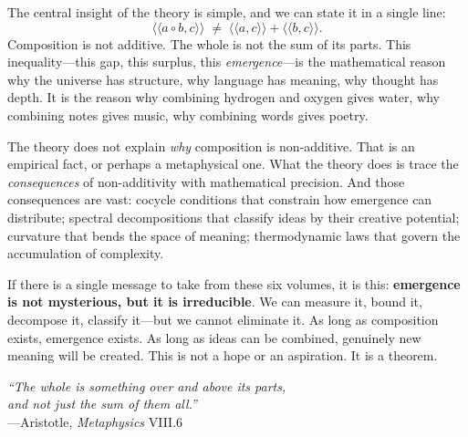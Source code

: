 \documentclass[11pt,oneside]{book}
\theoremstyle{definition}
\theoremstyle{plain}
\theoremstyle{remark}
\newcommand{\compose}{\circ}                 %
\newcommand{\rs}[2]{\langle\!\langle #1, #2 \rangle\!\rangle}  %
\begin{document}
The central insight of the theory is simple, and we can state it in a single
line:
\[
  \rs{a \compose b}{c} \;\neq\; \rs{a}{c} + \rs{b}{c}.
\]
Composition is not additive. The whole is not the sum of its parts. This
inequality---this gap, this surplus, this \emph{emergence}---is the mathematical
reason why the universe has structure, why language has meaning, why thought has
depth. It is the reason why combining hydrogen and oxygen gives water, why
combining notes gives music, why combining words gives poetry.

The theory does not explain \emph{why} composition is non-additive. That is an
empirical fact, or perhaps a metaphysical one. What the theory does is trace the
\emph{consequences} of non-additivity with mathematical precision. And those
consequences are vast: cocycle conditions that constrain how emergence can
distribute; spectral decompositions that classify ideas by their creative
potential; curvature that bends the space of meaning; thermodynamic laws that
govern the accumulation of complexity.

If there is a single message to take from these six volumes, it is this:
\textbf{emergence is not mysterious, but it is irreducible}. We can measure it,
bound it, decompose it, classify it---but we cannot eliminate it. As long as
composition exists, emergence exists. As long as ideas can be combined, genuinely
new meaning will be created. This is not a hope or an aspiration. It is a theorem.

\vspace{2em}
\begin{flushright}
\textit{``The whole is something over and above its parts,\\
and not just the sum of them all.''}\\
---Aristotle, \textit{Metaphysics} VIII.6
\end{flushright}
\end{document}

